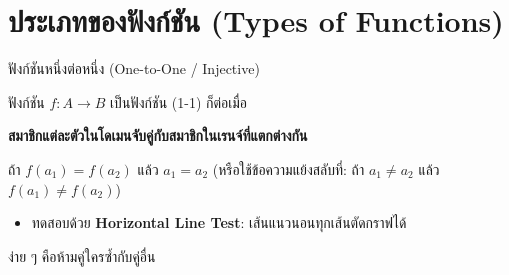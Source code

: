 \documentclass[11pt, aspectratio=169]{beamer}
\begin{document}
\section{ประเภทของฟังก์ชัน (Types of Functions)}

\begin{frame}{ฟังก์ชันหนึ่งต่อหนึ่ง (One-to-One / Injective)}
  \begin{explanation}[นิยาม]
    ฟังก์ชัน $f: A \to B$ เป็นฟังก์ชัน  (1-1) ก็ต่อเมื่อ

    \medskip
    \textbf{สมาชิกแต่ละตัวในโดเมนจับคู่กับสมาชิกในเรนจ์ที่แตกต่างกัน}

    \medskip
    ถ้า $f(a_1) = f(a_2)$ แล้ว $a_1 = a_2$
    (หรือใช้ข้อความแย้งสลับที่: ถ้า $a_1 \neq a_2$ แล้ว $f(a_1) \neq f(a_2)$)
  \end{explanation}

  \begin{itemize}
    \item ทดสอบด้วย \textbf{Horizontal Line Test}:
    เส้นแนวนอนทุกเส้นตัดกราฟได้ 
  \end{itemize}

  \begin{intuition}[สังเกต]
    ง่าย ๆ คือห้ามคู่ใครซํ้ากับคู่อื่น
  \end{intuition}
\end{frame}
\end{document}
